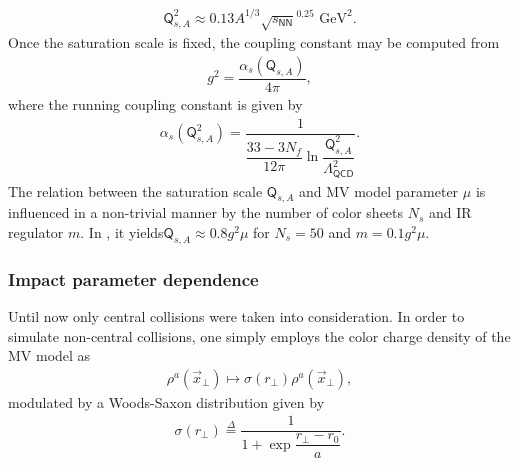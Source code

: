 \begin{align*}
    \textsf{Q}_{s,A}^2\approx 0.13 A^{1/3} \sqrt{s_{\textsf{NN}}} ^{0.25} \text{ GeV}^{2}.
\end{align*}
Once the saturation scale is fixed, the coupling constant may be computed from
\begin{align*}
    g^2=\dfrac{\alpha_s(\textsf{Q}_{s,A})}{4\pi},
\end{align*}
where the running coupling constant is given by
\begin{align*}
    \alpha_{s}(\textsf{Q}_{s,A}^{2})=\dfrac{1}{\dfrac{33-3N_f}{12\pi} \ln{\dfrac{\textsf{Q}_{s,A}^{2}}{\Lambda_{\textsf{QCD}}^{2}}}}.
\end{align*}
The relation between the saturation scale $\textsf{Q}_{s,A}$ and {\sffamily MV} model parameter $\mu$ is influenced in a non-trivial manner by the number of color sheets $N_s$ and {\sffamily IR} regulator $m$. In \cite{lappidis}, it yields$\textsf{Q}_{s,A}\approx 0.8g^2\mu$ for $N_s=50$ and $m=0.1g^2\mu$.

\subsubsection*{Impact parameter dependence}
Until now only central collisions were taken into consideration. In order to simulate non-central collisions, one simply employs the color charge density of the {\sffamily MV} model as
\begin{align*}
    \rho^a(\vec{x}_\perp)\mapsto \sigma(r_\perp)\rho^a(\vec{x}_\perp),
\end{align*}
modulated by a Woods-Saxon distribution given by
\begin{align*}
    \sigma(r_\perp)\overset{\Delta}{=}\dfrac{1}{1+\exp{\dfrac{r_\perp-r_0}{a}}}.
\end{align*}

